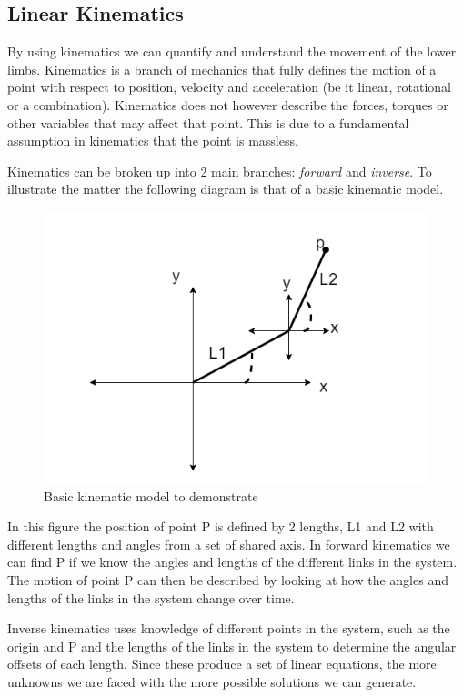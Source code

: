 \subsection{Linear Kinematics}
By using kinematics we can quantify and understand the movement of the lower limbs. Kinematics is a branch of mechanics that fully defines the motion of a point with respect to position, velocity and acceleration (be it linear, rotational or a combination). Kinematics does not however describe the forces, torques or other variables that may affect that point. This is due to a fundamental assumption in kinematics that the point is massless.	 

Kinematics can be broken up into 2 main branches: \textit{forward} and \textit{inverse}. To illustrate the matter the following diagram is that of a basic kinematic model.

\begin{figure}[!ht] 
\captionsetup{width=\linewidth, font=small}  
\includegraphics[width=\linewidth]{figures/kinematics.png}
\caption{Basic kinematic model to demonstrate}
\label{fig:kinematics}
\end{figure}

In this figure the position of point P is defined by 2 lengths, L1 and L2 with different lengths and angles from a set of shared axis. In forward kinematics we can find P if we know the angles and lengths of the different links in the system. The motion of point P can then be described by looking at  how the angles and lengths of the links in the system change over time.

Inverse kinematics uses knowledge of different points in the system, such as the origin and P and the lengths of the links in the system to determine the angular offsets of each length. Since these produce a set of linear equations, the more unknowns we are faced with the more possible solutions we can generate.

